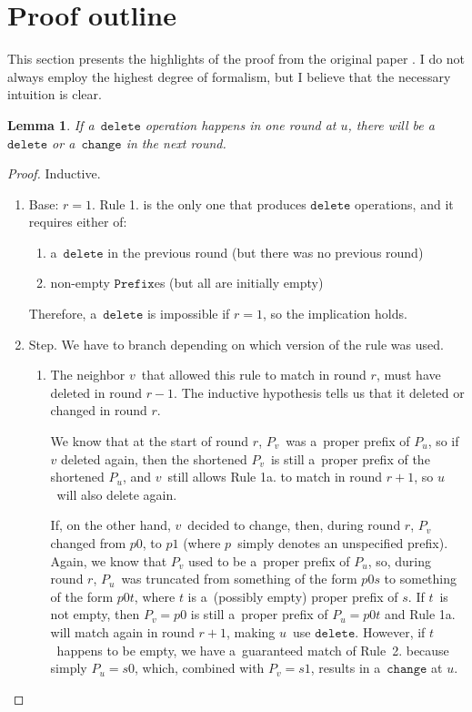 \documentclass{article}
\newtheorem{lemma}{Lemma}
\begin{document}
\section{Proof outline}
This section presents the highlights of the proof from the original paper \cite{Casteigts2016DeterministicLE}. I do not always employ the highest degree of formalism, but I believe that the necessary intuition is clear.
\begin{lemma}
\label{lemma:delete_then_delete_or_change}
If a~\(\texttt{delete}\) operation happens in one round at \(u\), there will be a~\(\texttt{delete}\) or a~\(\texttt{change}\) in the next round.
\end{lemma}
\begin{proof}
Inductive.
\begin{enumerate}[label={\arabic*.}]
    \item Base: \(r = 1\). Rule 1. is the only one that produces \(\texttt{delete}\) operations, and it requires either of:
        \begin{enumerate}[label={(\alph*)}]
            \item a~\(\texttt{delete}\) in the previous round (but there was no previous round)
            \item non-empty \(\texttt{Prefix}\)es (but all are initially empty)
        \end{enumerate}
        Therefore, a~\(\texttt{delete}\) is impossible if \(r = 1\), so the implication holds.
    \item Step. We have to branch depending on which version of the rule was used.
        \begin{enumerate}[label={(\alph*)}]
            \item The neighbor \(v\)~that allowed this rule to match in round \(r\), must have deleted in round \(r - 1\). The inductive hypothesis tells us that it deleted or changed in round \(r\).
            
                We know that at the start of round \(r\), \(P_v\)~was a~proper prefix of \(P_u\), so if \(v\) deleted again, then the shortened \(P_v\)~is still a~proper prefix of the shortened \(P_u\), and \(v\)~still allows Rule 1a. to match in round \(r + 1\), so \(u\)~will also delete again.
                
                If, on the other hand, \(v\)~decided to change, then, during round \(r\), \(P_v\) changed from \(p0\), to \(p1\) (where \(p\)~simply denotes an unspecified prefix). Again, we know that \(P_v\) used to be a~proper prefix of \(P_u\), so, during round \(r\), \(P_u\)~was truncated from something of the form \(p0s\) to something of the form \(p0t\), where \(t\) is a~(possibly empty) proper prefix of \(s\). If \(t\)~is not empty, then \(P_v = p0\) is still a~proper prefix of \(P_u = p0t\) and Rule 1a. will match again in round \(r + 1\), making \(u\)~use \(\texttt{delete}\). However, if \(t\)~happens to be empty, we have a~guaranteed match of Rule~2. because simply \(P_u = s0\), which, combined with \(P_v = s1\), results in a~\(\texttt{change}\) at \(u\).
                

\end{enumerate}
\end{enumerate}
\end{proof}
\end{document}
